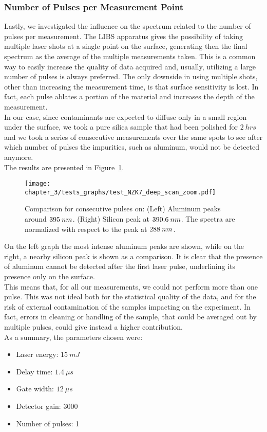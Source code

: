 \subsubsection{Number of Pulses per Measurement Point}
\label{subsec:number_pulses_mesurement}
Lastly, we investigated the influence on the spectrum related to the number of pulses per measurement. The LIBS apparatus gives the possibility of taking multiple laser shots at a single point on the surface, generating then the final spectrum as the average of the multiple measurements taken. This is a common way to easily increase the quality of data acquired and, usually, utilizing a large number of pulses is always preferred. The only downside in using multiple shots, other than increasing the measurement time, is that surface sensitivity is lost. In fact, each pulse ablates a portion of the material and increases the depth of the measurement.
\\ 
In our case, since contaminants are expected to diffuse only in a small region under the surface, we took a pure silica sample that had been polished for $2\:hrs$ and we took a series of consecutive measurements over the same spots to see after which number of pulses the impurities, such as aluminum, would not be detected anymore.
\\
The results are presented in Figure~\ref{fig:comparison_deep_scan}.
\begin{figure}[H]
    \centering
    \texttt{[image: chapter\_3/tests\_graphs/test\_NZK7\_deep\_scan\_zoom.pdf]} 
    \vspace*{-30pt}
    \caption[Comparison for consecutive pulses.]{Comparison for consecutive pulses on: (Left) Aluminum peaks around $\protect 395 \: nm$. (Right) Silicon peak at $\protect 390.6 \: nm$. The spectra are normalized with respect to the  peak at $\protect 288 \: nm$.}
    \label{fig:comparison_deep_scan}
\end{figure}
On the left graph the most intense aluminum peaks are shown, while on the right, a nearby silicon peak is shown as a comparison. It is clear that the presence of aluminum cannot be detected after the first laser pulse, underlining its presence only on the surface. 
\\
This means that, for all our measurements, we could not perform more than one pulse. This was not ideal both for the statistical quality of the data, and for the risk of external contamination of the samples impacting on the experiment. In fact, errors in cleaning or handling of the sample, that could be averaged out by multiple pulses, could give instead a higher contribution.
\\
As a summary, the parameters chosen were:
\begin{itemize}
\item Laser energy: $15 \: mJ$
\item Delay time: $1.4 \: \mu s$
\item Gate width: $12 \: \mu s$
\item Detector gain: 3000
\item Number of pulses: 1
\end{itemize}

